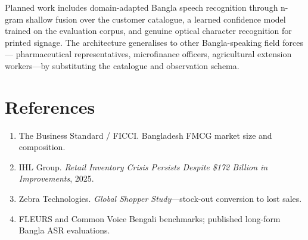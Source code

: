 \documentclass[11pt,a4paper]{article}
\begin{document}
Planned work includes domain-adapted Bangla speech recognition through n-gram
shallow fusion over the customer catalogue, a learned confidence model trained
on the evaluation corpus, and genuine optical character recognition for printed
signage. The architecture generalises to other Bangla-speaking field forces---%
pharmaceutical representatives, microfinance officers, agricultural extension
workers---by substituting the catalogue and observation schema.

\section*{References}
\small
\begin{enumerate}[leftmargin=1.6em, itemsep=1pt]
  \item The Business Standard / FICCI. Bangladesh FMCG market size and composition.
  \item IHL Group. \emph{Retail Inventory Crisis Persists Despite \$172 Billion in Improvements}, 2025.
  \item Zebra Technologies. \emph{Global Shopper Study}---stock-out conversion to lost sales.
  \item FLEURS and Common Voice Bengali benchmarks; published long-form Bangla ASR evaluations.
\end{enumerate}
\end{document}
